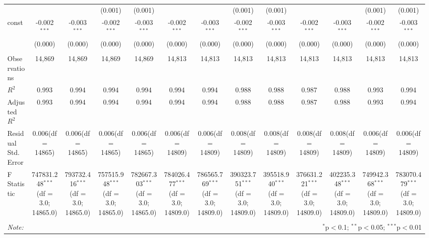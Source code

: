 \begin{table}[!htbp]
\begin{tabular}{@{\extracolsep{5pt}}lcccccccccccc}
  & & & (0.001) & (0.001) & & & (0.001) & (0.001) & & & (0.001) & (0.001) \\
 const & -0.002$^{***}$ & -0.003$^{***}$ & -0.002$^{***}$ & -0.003$^{***}$ & -0.002$^{***}$ & -0.003$^{***}$ & -0.002$^{***}$ & -0.003$^{***}$ & -0.002$^{***}$ & -0.003$^{***}$ & -0.002$^{***}$ & -0.003$^{***}$ \\
  & (0.000) & (0.000) & (0.000) & (0.000) & (0.000) & (0.000) & (0.000) & (0.000) & (0.000) & (0.000) & (0.000) & (0.000) \\
\hline \\[-1.8ex]
 Observations & 14,869 & 14,869 & 14,869 & 14,869 & 14,813 & 14,813 & 14,813 & 14,813 & 14,813 & 14,813 & 14,813 & 14,813 \\
 $R^2$ & 0.993 & 0.994 & 0.994 & 0.994 & 0.994 & 0.994 & 0.988 & 0.988 & 0.987 & 0.988 & 0.993 & 0.994 \\
 Adjusted $R^2$ & 0.993 & 0.994 & 0.994 & 0.994 & 0.994 & 0.994 & 0.988 & 0.988 & 0.987 & 0.988 & 0.993 & 0.994 \\
 Residual Std. Error & 0.006(df = 14865) & 0.006(df = 14865) & 0.006(df = 14865) & 0.006(df = 14865) & 0.006(df = 14809) & 0.006(df = 14809) & 0.008(df = 14809) & 0.008(df = 14809) & 0.008(df = 14809) & 0.008(df = 14809) & 0.006(df = 14809) & 0.006(df = 14809)  \\
 F Statistic & 747831.248$^{***}$ (df = 3.0; 14865.0) & 793732.416$^{***}$ (df = 3.0; 14865.0) & 757515.948$^{***}$ (df = 3.0; 14865.0) & 782667.303$^{***}$ (df = 3.0; 14865.0) & 784026.477$^{***}$ (df = 3.0; 14809.0) & 786565.769$^{***}$ (df = 3.0; 14809.0) & 390323.751$^{***}$ (df = 3.0; 14809.0) & 395518.940$^{***}$ (df = 3.0; 14809.0) & 376631.221$^{***}$ (df = 3.0; 14809.0) & 402235.348$^{***}$ (df = 3.0; 14809.0) & 749942.368$^{***}$ (df = 3.0; 14809.0) & 783070.479$^{***}$ (df = 3.0; 14809.0) \\
\hline
\hline \\[-1.8ex]
\textit{Note:} & \multicolumn{12}{r}{$^{*}$p$<$0.1; $^{**}$p$<$0.05; $^{***}$p$<$0.01} \\
\end{tabular}
\end{table}